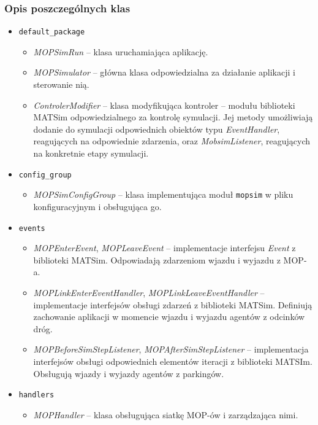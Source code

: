 \subsubsection{Opis poszczególnych klas}
\begin{itemize}
    \item \texttt{default\_package}
        \begin{itemize}
        \item \textit{MOPSimRun} -- klasa uruchamiająca aplikację.
        \item \textit{MOPSimulator} -- główna klasa odpowiedzialna za działanie aplikacji i sterowanie nią.
        \item \textit{ControlerModifier} -- klasa modyfikująca kontroler -- modułu biblioteki MATSim odpowiedzialnego za kontrolę symulacji. Jej metody umożliwiają dodanie do symulacji odpowiednich obiektów typu \textit{EventHandler}, reagujących na odpowiednie zdarzenia, oraz \textit{MobsimListener}, reagujących na konkretnie etapy symulacji.
        \end{itemize}
    \item \texttt{config\_group}
        \begin{itemize}
            \item \textit{MOPSimConfigGroup} -- klasa implementująca moduł \texttt{mopsim} w pliku konfiguracyjnym i obsługująca go.
        \end{itemize}
    \item \texttt{events}
        \begin{itemize}
            \item \textit{MOPEnterEvent}, \textit{MOPLeaveEvent} -- implementacje interfejsu \textit{Event} z biblioteki MATSim. Odpowiadają zdarzeniom wjazdu i wyjazdu z MOP-a.
            \item \textit{MOPLinkEnterEventHandler}, \textit{MOPLinkLeaveEventHandler} -- implementacje interfejsów obsługi zdarzeń z biblioteki MATSim. Definiują zachowanie aplikacji w momencie wjazdu i wyjazdu agentów z odcinków dróg.
            \item \textit{MOPBeforeSimStepListener}, \textit{MOPAfterSimStepListener} -- implementacja interfejsów obsługi odpowiednich elementów iteracji z biblioteki MATSIm. Obsługują wjazdy i wyjazdy agentów z parkingów.
        \end{itemize}
    \item \texttt{handlers}
        \begin{itemize}
            \item \textit{MOPHandler} -- klasa obsługująca siatkę MOP-ów i zarządzająca nimi.

\end{itemize}
\end{itemize}
